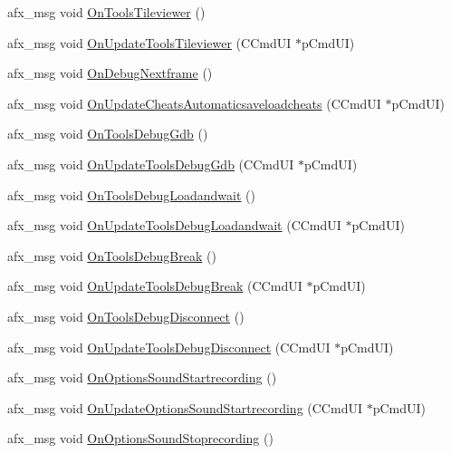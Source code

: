 \begin{DoxyCompactItemize}
\item 
afx\+\_\+msg void \mbox{\hyperlink{class_main_wnd_ab456c9b37a33a87b68dc0d3ca74b0246}{On\+Tools\+Tileviewer}} ()
\item 
afx\+\_\+msg void \mbox{\hyperlink{class_main_wnd_a980070c28374d525e43990697d3b10fd}{On\+Update\+Tools\+Tileviewer}} (C\+Cmd\+UI $\ast$p\+Cmd\+UI)
\item 
afx\+\_\+msg void \mbox{\hyperlink{class_main_wnd_aee77d5bcdf32fa6ae1ede10345b449b3}{On\+Debug\+Nextframe}} ()
\item 
afx\+\_\+msg void \mbox{\hyperlink{class_main_wnd_afa1543743f747c2a7de5f4b7a60be05b}{On\+Update\+Cheats\+Automaticsaveloadcheats}} (C\+Cmd\+UI $\ast$p\+Cmd\+UI)
\item 
afx\+\_\+msg void \mbox{\hyperlink{class_main_wnd_afd978409fe7d362576094249789ea364}{On\+Tools\+Debug\+Gdb}} ()
\item 
afx\+\_\+msg void \mbox{\hyperlink{class_main_wnd_a0b78ffc6321596788767291e2d139e6f}{On\+Update\+Tools\+Debug\+Gdb}} (C\+Cmd\+UI $\ast$p\+Cmd\+UI)
\item 
afx\+\_\+msg void \mbox{\hyperlink{class_main_wnd_a9a253419b0bc7b8b246b68fcaefc1668}{On\+Tools\+Debug\+Loadandwait}} ()
\item 
afx\+\_\+msg void \mbox{\hyperlink{class_main_wnd_a747e0b43ebf87f4b3551767a9fce4d9e}{On\+Update\+Tools\+Debug\+Loadandwait}} (C\+Cmd\+UI $\ast$p\+Cmd\+UI)
\item 
afx\+\_\+msg void \mbox{\hyperlink{class_main_wnd_af61485d2b07b79fb1efc1cc6437d1ab1}{On\+Tools\+Debug\+Break}} ()
\item 
afx\+\_\+msg void \mbox{\hyperlink{class_main_wnd_ae3d32c8d517114261df5adc88ff0f2c9}{On\+Update\+Tools\+Debug\+Break}} (C\+Cmd\+UI $\ast$p\+Cmd\+UI)
\item 
afx\+\_\+msg void \mbox{\hyperlink{class_main_wnd_aecca3d7d993909f95fe965275b73efae}{On\+Tools\+Debug\+Disconnect}} ()
\item 
afx\+\_\+msg void \mbox{\hyperlink{class_main_wnd_a41dd5d381b27cae7a9f7d1d685d1ab09}{On\+Update\+Tools\+Debug\+Disconnect}} (C\+Cmd\+UI $\ast$p\+Cmd\+UI)
\item 
afx\+\_\+msg void \mbox{\hyperlink{class_main_wnd_a61b3657a1df45da0e444c99fa5b298c5}{On\+Options\+Sound\+Startrecording}} ()
\item 
afx\+\_\+msg void \mbox{\hyperlink{class_main_wnd_afe112a4df6bc333e8b7e6ffc3521fe5f}{On\+Update\+Options\+Sound\+Startrecording}} (C\+Cmd\+UI $\ast$p\+Cmd\+UI)
\item 
afx\+\_\+msg void \mbox{\hyperlink{class_main_wnd_ab2f36ba26274b2b2d5b9f2cd5d74f9f2}{On\+Options\+Sound\+Stoprecording}} ()

\end{DoxyCompactItemize}
